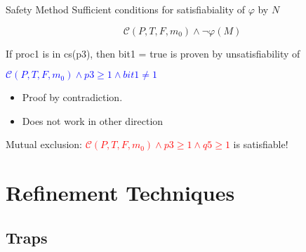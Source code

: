 \documentclass{beamer}
\begin{document}
\begin{frame}{Safety Method}
  Sufficient conditions for satisfiabiality of $\varphi$ by $N$
  \begin{block}{}
    $$\mathcal{C}(P,T,F,m_0) \land \neg\varphi(M) $$
  \end{block}
\begin{example}
  If proc1 is in cs(p3), then bit1 = true is proven by unsatisfiability of 
  \begin{center}
  \textcolor{blue}{$\mathcal{C}(P,T,F,m_0) \land p3 \geq 1 \land bit1 \neq 1$}
  \end{center}
\end{example}
  \begin{itemize}
  \item Proof by contradiction.

  \item Does not work in other direction
  \end{itemize}
\begin{example}
 Mutual exclusion: \textcolor{red}{$\mathcal{C}(P,T,F,m_0)\land p3 \geq 1 \land q5 \geq 1 $} is satisfiable!
\end{example}


\end{frame}

\section{Refinement Techniques}

\subsection{Traps}
\end{document}

